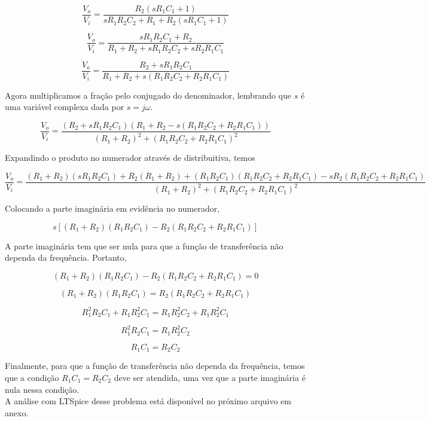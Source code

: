 \documentclass[12pt]{scrartcl}
\begin{document}
\[ \frac{V_o}{V_i} = \frac{R_2(sR_1C_1 + 1)}{sR_1R_2C_2 + R_1 + R_2(sR_1C_1 + 1)}  \]

\[ \frac{V_o}{V_i} = \frac{sR_1R_2C_1 + R_2}{R_1 + R_2 + sR_1R_2C_2 + sR_2R_1C_1}  \]

\[ \frac{V_o}{V_i} = \frac{R_2 + sR_1R_2C_1}{R_1 + R_2 + s(R_1R_2C_2 + R_2R_1C_1)}  \]

Agora multiplicamos a fração pelo conjugado do denominador, lembrando que $s$ é uma variável complexa
dada por $s = j\omega$.

\[ \frac{V_o}{V_i} = \frac{(R_2 + sR_1R_2C_1) (R_1 + R_2 - s(R_1R_2C_2 + R_2R_1C_1))}{(R_1 + R_2)^2 + (R_1R_2C_2 + R_2R_1C_1)^2}  \]

Expandindo o produto no numerador através de distribuitiva, temos

\[ \frac{V_o}{V_i} = \frac{(R_1 + R_2)(sR_1R_2C_1) + R_2(R_1 + R_2) + (R_1R_2C_1)(R_1R_2C_2 + R_2R_1C_1) - sR_2(R_1R_2C_2 + R_2R_1C_1)}{(R_1 + R_2)^2 + (R_1R_2C_2 + R_2R_1C_1)^2}  \]

Colocando a parte imaginária em evidência no numerador,

\[ s\left[(R_1 + R_2)(R_1R_2C_1) - R_2(R_1R_2C_2 + R_2R_1C_1)\right] \]

A parte imaginária tem que ser nula para que a função de transferência não dependa
da frequência. Portanto,

\[ (R_1 + R_2)(R_1R_2C_1) - R_2(R_1R_2C_2 + R_2R_1C_1) = 0 \]

\[ (R_1 + R_2)(R_1R_2C_1) = R_2(R_1R_2C_2 + R_2R_1C_1) \]

\[ R_1^2R_2C_1 + R_1R_2^2C_1 = R_1R_2^2C_2 + R_1R_2^2C_1 \]

\[ R_1^2R_2C_1 = R_1R_2^2C_2 \]

\[ \boxed{ R_1C_1 = R_2C_2} \]

Finalmente, para que a função de transferência não dependa da frequência, temos que a condição 
$R_1C_1 = R_2C_2$ deve ser atendida, uma vez que a parte imaginária é nula nessa condição.\\

A análise com LTSpice desse problema está disponível no próximo arquivo em anexo.
\end{document}
